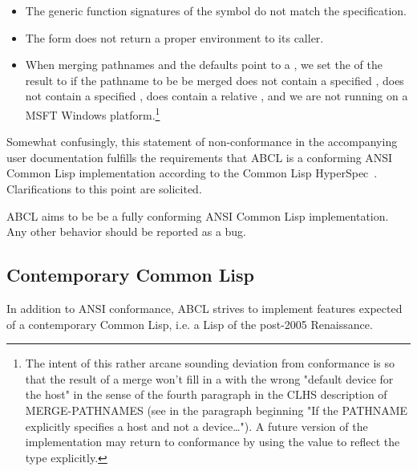 \documentclass[10pt]{book}
\begin{document}
\begin{itemize}
\item The generic function signatures of the  symbol
  do not match the specification.
\item The  form does not return a proper 
  environment to its caller.
\item When merging pathnames and the defaults point to a ,
  we set the  of the result to  if the pathname to be
  be merged does not contain a specified , does not contain a
  specified , does contain a relative , and we are
  not running on a \textsc{MSFT} Windows platform.\footnote{The intent of this
    rather arcane sounding deviation from conformance is so that the
    result of a merge won't fill in a  with the wrong "default
    device for the host" in the sense of the fourth paragraph in the
    \textsc{CLHS} description of MERGE-PATHNAMES (see in \cite{CLHS} the paragraph beginning
    "If the PATHNAME explicitly specifies a host and not a device…").
    A future version of the implementation may return to conformance
    by using the  value to reflect the type explicitly.
  }

\end{itemize}

Somewhat confusingly, this statement of non-conformance in the
accompanying user documentation fulfills the requirements that
\textsc{ABCL} is a conforming ANSI Common Lisp implementation according
to the Common Lisp HyperSpec~\cite{CLHS}.  Clarifications to this point
are solicited.

\textsc{ABCL} aims to be be a fully conforming \textsc{ANSI} Common Lisp implementation.
Any other behavior should be reported as a bug.

\subsection{Contemporary Common Lisp}
In addition to \textsc{ANSI} conformance, \textsc{ABCL} strives to implement
features expected of a contemporary Common Lisp, i.e. a Lisp of the
post-2005 Renaissance.
\end{document}
